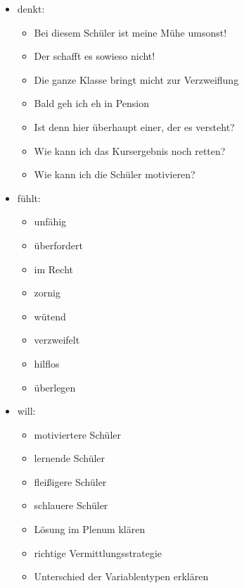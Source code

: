 \documentclass[12pt]{scrartcl}
\begin{document}
\begin{itemize}
  \item denkt:
  \begin{itemize}
    \item Bei diesem Schüler ist meine Mühe umsonst!
    \item Der schafft es sowieso nicht!
    \item Die ganze Klasse bringt micht zur Verzweiflung
    \item Bald geh ich eh in Pension
    \item Ist denn hier überhaupt einer, der es versteht?
    \item Wie kann ich das Kursergebnis noch retten?
    \item Wie kann ich die Schüler motivieren?
  \end{itemize}
  \item fühlt:
  \begin{itemize}
    \item unfähig
    \item überfordert
    \item im Recht
    \item zornig
    \item wütend
    \item verzweifelt
    \item hilflos
    \item überlegen
  \end{itemize}
  \item will:
  \begin{itemize}
    \item motiviertere Schüler
    \item lernende Schüler
    \item fleißigere Schüler
    \item schlauere Schüler
    \item Lösung im Plenum klären
    \item richtige Vermittlungsstrategie
    \item Unterschied der Variablentypen erklären
  \end{itemize}
\end{itemize}
\end{document}
